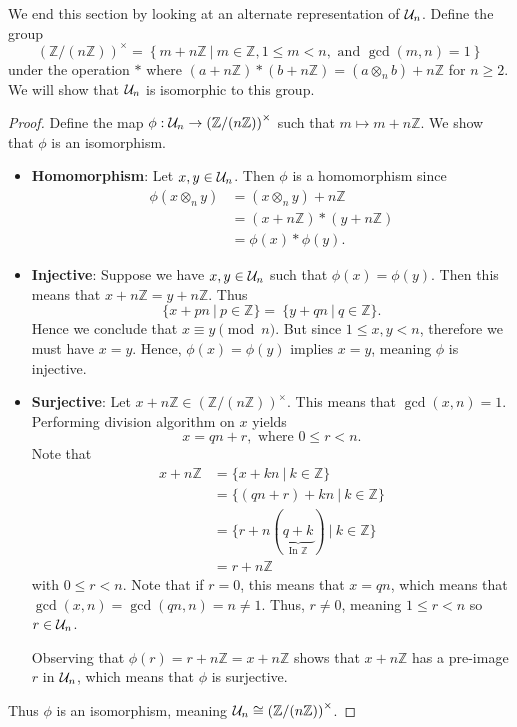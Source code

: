 We end this section by looking at an alternate representation of $\mathcal{U}_{n}$. Define the group
\[
    \left(\mathbb{Z}/(n\mathbb{Z})\right)^{\times} = \left\{m + n\mathbb{Z} \ \vert \ m \in \mathbb{Z}, 1 \leq m < n, \text{ and } \gcd(m, n)=1\right\}
\]
under the operation $\ast$ where $(a+n\mathbb{Z})\ast(b+n\mathbb{Z}) = (a\otimes_n b) + n\mathbb{Z}$ for $n \geq 2$. We will show that $\mathcal{U}_{n}$ is isomorphic to this group.
\begin{proof}
    Define the map $\phi: \mathcal{U}_{n} \to \left(\mathbb{Z}/(n\mathbb{Z})\right)^{\times}$ such that $m \mapsto m + n\mathbb{Z}$. We show that $\phi$ is an isomorphism.

    \begin{itemize}
        \item \textbf{Homomorphism}: Let $x, y \in \mathcal{U}_{n}$. Then $\phi$ is a homomorphism since
        \begin{align*}
            \phi(x \otimes_n y) &= (x \otimes_n y) + n\mathbb{Z}\\
            &= (x + n\mathbb{Z}) \ast (y + n\mathbb{Z})\\
            &= \phi(x) \ast \phi(y).
        \end{align*}

        \item \textbf{Injective}: Suppose we have $x, y \in \mathcal{U}_{n}$ such that $\phi(x) = \phi(y)$. Then this means that $x + n\mathbb{Z} = y + n\mathbb{Z}$. Thus
        \[
            \{x + pn \ | \ p \in \mathbb{Z} \} = \ \{y + qn \ | \ q \in \mathbb{Z} \}.
        \]
        Hence we conclude that $x \equiv y \pmod{n}$. But since $1 \leq x, y < n$, therefore we must have $x = y$. Hence, $\phi(x) = \phi(y)$ implies $x = y$, meaning $\phi$ is injective.

        \item \textbf{Surjective}: Let $x + n\mathbb{Z} \in \left(\mathbb{Z}/(n\mathbb{Z})\right)^{\times}$. This means that $\gcd(x, n) = 1$. Performing division algorithm on $x$ yields
        \[
            x = qn + r, \text{ where } 0 \leq r < n.
        \]
        Note that
        \begin{align*}
            x + n\mathbb{Z} &= \{x + kn \ | \ k \in \mathbb{Z}\}\\
            &= \{(qn + r) + kn \ | \ k \in \mathbb{Z}\}\\
            &= \{r + n(\underbrace{q+k}_{\text{In } \mathbb{Z}}) \ | \ k \in \mathbb{Z}\}\\
            &= r + n\mathbb{Z}
        \end{align*}
        with $0 \leq r < n$. Note that if $r = 0$, this means that $x = qn$, which means that $\gcd(x, n) = \gcd(qn, n) = n \neq 1$. Thus, $r \neq 0$, meaning $1 \leq r < n$ so $r \in \mathcal{U}_{n}$.

        Observing that $\phi(r) = r + n\mathbb{Z} = x + n\mathbb{Z}$ shows that $x + n\mathbb{Z}$ has a pre-image $r$ in $\mathcal{U}_{n}$, which means that $\phi$ is surjective.
    \end{itemize}

    Thus $\phi$ is an isomorphism, meaning $\mathcal{U}_{n} \cong \left(\mathbb{Z}/(n\mathbb{Z})\right)^{\times}$.
\end{proof}

